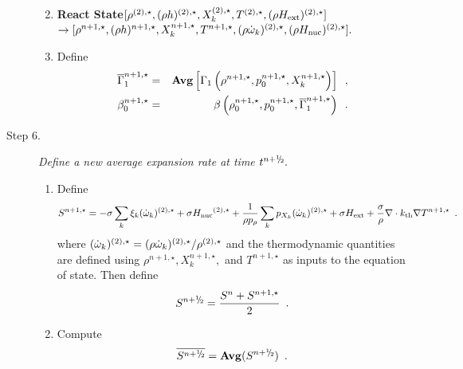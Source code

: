 \begin{description}
\begin{enumerate}
\renewcommand{\theenumi}{{\bf \alph{enumi}}}

\item {\bf React State}$[ \rho^{(2),\star},(\rho h)^{(2),\star}, X_k^{(2),\star}, 
                             T^{(2),\star}, (\rho{H_{\rm ext}})^{(2),\star}] $\\
$\rightarrow [ \rho^{n+1,\star},(\rho h)^{n+1,\star}, X_k^{n+1,\star}, T^{n+1,\star}, 
              (\rho \dot{\omega}_k)^{(2),\star}, (\rho {H_{\rm nuc}})^{(2),\star} ].$  

\item Define
\begin{eqnarray}
 \overline{\Gamma}_1^{n+1,\star}    &=& {\rm{\bf Avg}} \left[ \Gamma_1\left(\rho^{n+1,\star}, p_0^{n+1,\star}, 
                                                      X_k^{n+1,\star}\right) \right] \enskip , \\
 {\beta   }_0^{n+1,\star}    &=& \beta   \left(\rho_0^{n+1,\star}, p_0^{n+1,\star}, \overline{\Gamma}_1^{n+1,\star}\right) \enskip .
\end{eqnarray}

\end{enumerate}

\item[Step 6.] {\em Define a new average expansion rate at time $t^\nph.$}

\begin{enumerate}
\renewcommand{\theenumi}{{\bf \alph{enumi}}}
\item Define
\begin{equation}
  S^{n+1,\star} =  -\sigma  \sum_k  \xi_k  (\dot{\omega}_k)^{(2),\star}  + 
  \sigma {H_{\rm nuc}}^{(2),\star} +
  \frac{1}{\rho p_\rho} \sum_k p_{X_k}  ({\dot{\omega}}_k)^{(2),\star}  
  + \sigma {H_{\rm ext}} + \frac{\sigma}{\rho}\nabla\cdot k_{\rm th}\nabla T^{n+1,\star} \enskip .
\end{equation} 
where $(\dot{\omega}_k)^{(2),\star} = (\rho \dot{\omega}_k)^{(2),\star} / \rho^{(2),\star}$
and the thermodynamic quantities are defined using $\rho^{n+1,\star}, X_k^{n+1,\star},$ 
and $T^{n+1,\star}$ as inputs to the equation of state.
Then define
\begin{equation}
 S^\nph = \frac{S^n + S^{n+1,\star}}{2} \enskip. 
\end{equation}

\item Compute
\begin{equation}
\overline{S^{\nph}} = {\mathrm{\bf Avg}} (S^{\nph}) \enskip.
\end{equation}


\end{enumerate}
\end{description}
